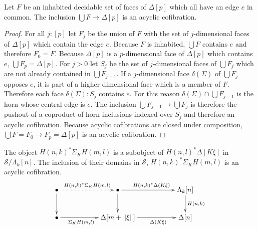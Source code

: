\documentclass{tac}
\newcommand\cat\mathcal
\newcommand\ri{^*}
\newcommand\of{:}
\newcommand\simplex\Delta
\newcommand\horn\Lambda
\newcommand\norm[1]{\Vert #1 \Vert}
\newcommand\depsum{\Sigma_}
\newcommand\face\delta
\begin{document}
\begin{lemma} Let $F$ be an inhabited decidable set of faces of $\simplex[p]$ which all have an edge $e$ in common. The inclusion $\bigcup F\to \simplex[p]$ is an acyclic cofibration. \label{face completion} \end{lemma}

\begin{proof} For all $j\of[p]$ let $F_j$ be the union of $F$ with the set of $j$-dimensional faces of $\simplex[p]$ which contain the edge $e$. Because $F$ is inhabited, $\bigcup F$ contains $e$ and therefore $F_0=F$. Because $\simplex[p]$ is a $p$-dimensional face of $\simplex[p]$ which contains $e$, $\bigcup F_p = \simplex[p]$. For $j>0$ let $S_j$ be the set of $j$-dimensional faces of $\bigcup F_j$ which are not already contained in $\bigcup F_{j-1}$. If a $j$-dimensional face $\face(\Sigma)$ of $\bigcup F_j$ opposes $e$, it is part of a higher dimensional face which is a member of $F$. Therefore each face $\face(\Sigma)\of S_j$ contains $e$. For this reason $\face(\Sigma)\cap \bigcup F_{j-1}$ is the horn whose central edge is $e$. The inclusion $\bigcup F_{j-1}\to\bigcup F_j$ is therefore the pushout of a coproduct of horn inclusions indexed over $S_j$ and therefore an acyclic cofibration. Because acyclic cofibrations are closed under composition, $\bigcup F = F_0\to F_p = \simplex[p]$ is an acyclic cofibration. 
\end{proof}

\begin{lemma} The object $H(n,k)\ri \depsum K H(m,l)$ is a subobject of $H(n,l)\ri\simplex[K\xi]$ in $\cat S/\horn_k[n]$. The inclusion of their domains in $\cat S$, $H(n,k)\ri \depsum K H(m,l)$ is an acyclic cofibration. \label{acyclic cofibrancy} 
\[\xymatrix{
\bullet \ar@{.>}[rr]^{H(n,k)\ri \depsum K H(m,l)} \ar[d] && \bullet\ar[rr]^{H(n,k)\ri\simplex(K\xi)}\ar[d] && \horn_k[n]\ar[d]^{H(n,k)}\\
\bullet\ar[rr]_(.4){\depsum K H(m,l)} && \simplex[m+\norm\xi]\ar[rr]_(.6){\simplex(K\xi)} && \simplex[n]
}\]
\end{lemma}
\end{document}
